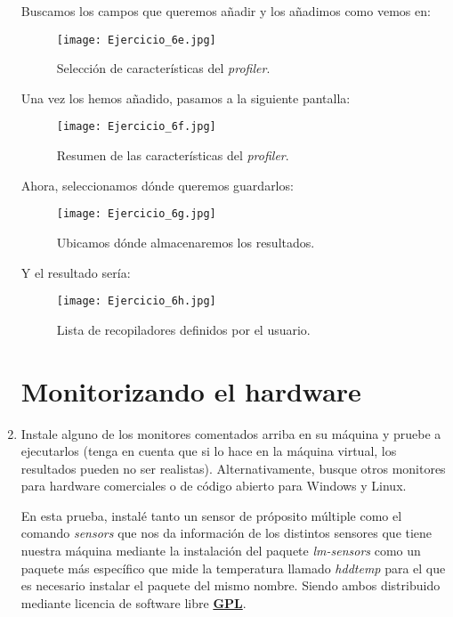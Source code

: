 \documentclass[paper=a4, fontsize=11pt]{scrartcl} %
\numberwithin{equation}{section} %
\numberwithin{figure}{section} %
\numberwithin{table}{section} %
\begin{document}
\begin{enumerate}
		Buscamos los campos que queremos añadir y los añadimos como vemos en:
		
		\begin{figure}[H]
			\texttt{[image: Ejercicio\_6e.jpg]}
			\caption{Selección de características del \textit{profiler}.}
			\label{fig:SP_configure}
		\end{figure}
		
		Una vez los hemos añadido, pasamos a la siguiente pantalla:
		
		\begin{figure}[H]
			\centering
			\texttt{[image: Ejercicio\_6f.jpg]}
			\caption{Resumen de las características del \textit{profiler}.}
			\label{fig:SP_summary}
		\end{figure}
		
		Ahora, seleccionamos dónde queremos guardarlos:
		 
		\begin{figure}[H]
			\centering
			\texttt{[image: Ejercicio\_6g.jpg]}
			\caption{Ubicamos dónde almacenaremos los resultados.}
			\label{fig:SP_save}
		\end{figure}
		
		Y el resultado sería:
		
		\begin{figure}[H]
			\centering
			\texttt{[image: Ejercicio\_6h.jpg]}
			\caption{Lista de recopiladores definidos por el usuario.}
			\label{fig:SP_all}
		\end{figure}
		
	\section{Monitorizando el hardware}
		\item Instale alguno de los monitores comentados arriba en su máquina y pruebe a ejecutarlos
		(tenga en cuenta que si lo hace en la máquina virtual, los resultados pueden no ser
		realistas). Alternativamente, busque otros monitores para hardware comerciales o de código
		abierto para Windows y Linux.
		
		En esta prueba, instalé tanto un sensor de próposito múltiple como el comando \textit{sensors}
		\cite{man_sensors} que nos da información de los distintos sensores que tiene nuestra máquina
		mediante la instalación del paquete \textit{lm-sensors} como un paquete más específico que mide
		la temperatura llamado \textit{hddtemp}\cite{man_hddtemp} para el que es necesario instalar el
		paquete del mismo nombre. Siendo ambos distribuido mediante licencia de software libre
		\href{https://www.gnu.org/licenses/gpl.html}{\textbf{GPL}}.
		

\end{enumerate}
\end{document}
